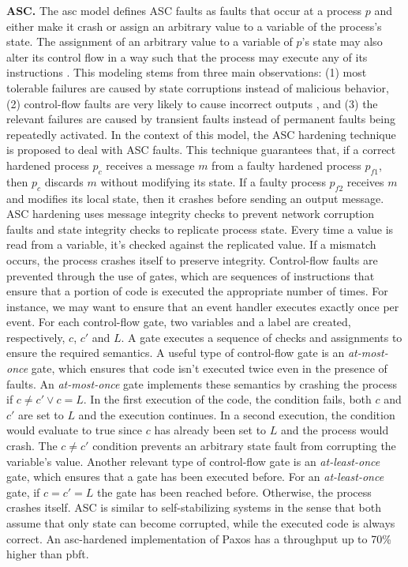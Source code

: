 \textbf{ASC.} The \acrfull{asc} model defines ASC faults as faults that occur at a process $p$ and either make it crash or assign an arbitrary value to a variable of the process's state. The assignment of an arbitrary value to a variable of $p$'s state may also alter its control flow in a way such that the process may execute any of its instructions \cite{Correia2012}. This modeling stems from three main observations: (1) most tolerable failures are caused by state corruptions instead of malicious behavior, (2) control-flow faults are very likely to cause incorrect outputs \cite{Kalbarczyk2003}, and (3) the relevant failures are caused by transient faults instead of permanent faults being repeatedly activated. In the context of this model, the ASC hardening technique is proposed to deal with ASC faults. This technique guarantees that, if a correct hardened process $p_c$ receives a message $m$ from a faulty hardened process $p_{f1}$, then $p_c$ discards $m$ without modifying its state. If a faulty process $p_{f2}$ receives $m$ and modifies its local state, then it crashes before sending an output message. ASC hardening uses message integrity checks to prevent network corruption faults and state integrity checks to replicate process state. Every time a value is read from a variable, it's checked against the replicated value. If a mismatch occurs, the process crashes itself to preserve integrity. Control-flow faults are prevented through the use of gates, which are sequences of instructions that ensure that a portion of code is executed the appropriate number of times. For instance, we may want to ensure that an event handler executes exactly once per event. For each control-flow gate, two variables and a label are created, respectively, $c$, $c'$ and $L$. A gate executes a sequence of checks and assignments to ensure the required semantics. A useful type of control-flow gate is an \textit{at-most-once} gate, which ensures that code isn't executed twice even in the presence of faults. An \textit{at-most-once} gate implements these semantics by crashing the process if $c \neq c' \vee c=L$. In the first execution of the code, the condition fails, both $c$ and $c'$ are set to $L$ and the execution continues. In a second execution, the condition would evaluate to true since $c$ has already been set to $L$ and the process would crash. The $c \neq c'$ condition prevents an arbitrary state fault from corrupting the variable's value. Another relevant type of control-flow gate is an \textit{at-least-once} gate, which ensures that a gate has been executed before. For an \textit{at-least-once} gate, if $c=c'=L$ the gate has been reached before. Otherwise, the process crashes itself. ASC is similar to self-stabilizing systems \cite{Dijkstra1974} in the sense that both assume that only state can become corrupted, while the executed code is always correct. An \acrshort{asc}-hardened implementation of Paxos has a throughput up to 70\% higher than \acrshort{pbft}. \par
